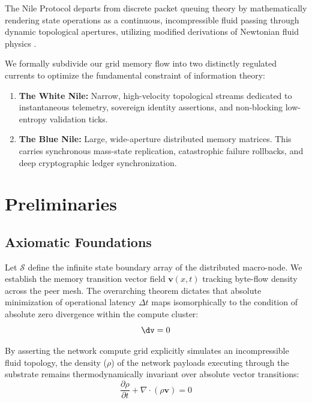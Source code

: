 \documentclass[12pt, a4paper]{article}
\theoremstyle{plain}
\theoremstyle{definition}
\begin{document}
The Nile Protocol departs from discrete packet queuing theory by mathematically rendering state operations as a continuous, incompressible fluid passing through dynamic topological apertures, utilizing modified derivations of Newtonian fluid physics \cite{navier1822memoire, penrose1989emperor}.

We formally subdivide our grid memory flow into two distinctly regulated currents to optimize the fundamental constraint of information theory:
\begin{enumerate}
    \item \textbf{The White Nile:} Narrow, high-velocity topological streams dedicated to instantaneous telemetry, sovereign identity assertions, and non-blocking low-entropy validation ticks.  
    \item \textbf{The Blue Nile:} Large, wide-aperture distributed memory matrices. This carries synchronous mass-state replication, catastrophic failure rollbacks, and deep cryptographic ledger synchronization.
\end{enumerate}

\section{Preliminaries}\label{sec:prelim}

\subsection{Axiomatic Foundations}
Let $\mathcal{S}$ define the infinite state boundary array of the distributed macro-node. We establish the memory transition vector field $\mathbf{v}(x, t)$ tracking byte-flow density across the peer mesh. The overarching theorem dictates that absolute minimization of operational latency $\Delta t$ maps isomorphically to the condition of absolute zero divergence within the compute cluster:
\begin{equation}
    \dv = 0
\end{equation}

By asserting the network compute grid explicitly simulates an incompressible fluid topology, the density ($\rho$) of the network payloads executing through the substrate remains thermodynamically invariant over absolute vector transitions:
\begin{equation}
    \frac{\partial \rho}{\partial t} + \nabla \cdot (\rho \mathbf{v}) = 0
\end{equation}
\end{document}
